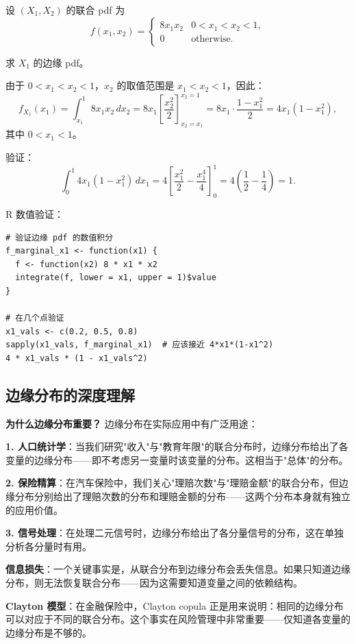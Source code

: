 \begin{example}[连续边缘分布]\label{ex:marginal-continuous-ch2}
设 $(X_1, X_2)$ 的联合 pdf 为
\[
f(x_1, x_2) = \begin{cases}
8x_1 x_2 & 0 < x_1 < x_2 < 1, \\
0 & \text{otherwise}.
\end{cases}
\]

求 $X_1$ 的边缘 pdf。

由于 $0 < x_1 < x_2 < 1$，$x_2$ 的取值范围是 $x_1 < x_2 < 1$，因此：
\[
f_{X_1}(x_1) = \int_{x_1}^{1} 8x_1 x_2 \, dx_2 = 8x_1 \left[\frac{x_2^2}{2}\right]_{x_2=x_1}^{x_2=1} = 8x_1 \cdot \frac{1 - x_1^2}{2} = 4x_1(1 - x_1^2),
\]
其中 $0 < x_1 < 1$。

验证：
\[
\int_0^1 4x_1(1 - x_1^2) \, dx_1 = 4\left[\frac{x_1^2}{2} - \frac{x_1^4}{4}\right]_0^1 = 4\left(\frac{1}{2} - \frac{1}{4}\right) = 1.
\]

R 数值验证：
\begin{verbatim}
# 验证边缘 pdf 的数值积分
f_marginal_x1 <- function(x1) {
  f <- function(x2) 8 * x1 * x2
  integrate(f, lower = x1, upper = 1)$value
}

# 在几个点验证
x1_vals <- c(0.2, 0.5, 0.8)
sapply(x1_vals, f_marginal_x1)  # 应该接近 4*x1*(1-x1^2)
4 * x1_vals * (1 - x1_vals^2)
\end{verbatim}
\end{example}

\subsection{边缘分布的深度理解}

\textbf{为什么边缘分布重要？} 边缘分布在实际应用中有广泛用途：

\textbf{1. 人口统计学}：当我们研究"收入"与"教育年限"的联合分布时，边缘分布给出了各变量的边缘分布——即不考虑另一变量时该变量的分布。这相当于"总体"的分布。

\textbf{2. 保险精算}：在汽车保险中，我们关心"理赔次数"与"理赔金额"的联合分布，但边缘分布分别给出了理赔次数的分布和理赔金额的分布——这两个分布本身就有独立的应用价值。

\textbf{3. 信号处理}：在处理二元信号时，边缘分布给出了各分量信号的分布，这在单独分析各分量时有用。

\textbf{信息损失}：一个关键事实是，从联合分布到边缘分布会丢失信息。如果只知道边缘分布，则无法恢复联合分布——因为这需要知道变量之间的依赖结构。

\textbf{Clayton 模型}：在金融保险中，Clayton copula 正是用来说明：相同的边缘分布可以对应于不同的联合分布。这个事实在风险管理中非常重要——仅知道各变量的边缘分布是不够的。
